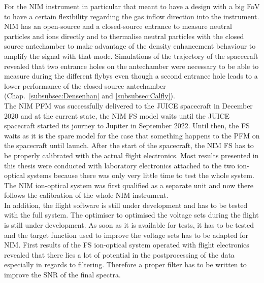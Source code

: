 	For the NIM instrument in particular that meant to have a design with a big FoV to have a certain flexibility regarding the gas inflow direction into the instrument. NIM has an open-source and a closed-source entrance to measure neutral particles and ions directly and to thermalise neutral particles with the closed source antechamber to make advantage of the density enhancement behaviour to amplify the signal with that mode. Simulations of the trajectory of the spacecraft revealed that two entrance holes on the antechamber were necessary to be able to measure during the different flybys even though a second entrance hole leads to a lower performance of the closed-source antechamber (Chap.~\ref{subsubsec:Densenhan} and \ref{subsubsec:Calfly}).\\
	
	The NIM PFM was successfully delivered to the JUICE spacecraft in December 2020 and at the current state, the NIM FS model waits until the JUICE spacecraft started its journey to Jupiter in September 2022. Until then, the FS waits as it is the spare model for the case that something happens to the PFM on the spacecraft until launch. After the start of the spacecraft, the NIM FS has to be properly calibrated with the actual flight electronics. Most results presented in this thesis were conducted with laboratory electronics attached to the two ion-optical systems because there was only very little time to test the whole system. The NIM ion-optical system was first qualified as a separate unit and now there follows the calibration of the whole NIM instrument.\\
	In addition, the flight software is still under development and has to be tested with the full system. The optimiser to optimised the voltage sets during the flight is still under development. As soon as it is available for tests, it has to be tested and the target function used to improve the voltage sets has to be adapted for NIM. First results of the FS ion-optical system operated with flight electronics revealed that there lies a lot of potential in the postprocessing of the data especially in regards to filtering. Therefore a proper filter has to be written to improve the SNR of the final spectra.\\

